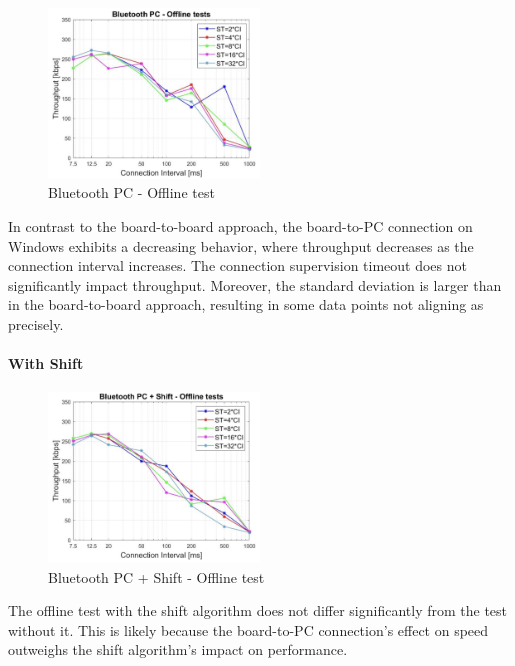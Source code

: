 \documentclass{Configuration_Files/PoliMi3i_thesis}
\begin{document}
\begin{figure}[H]
    \centering
    \includegraphics[width=0.5\textwidth]{Results Manuel/figure33}
    \caption{Bluetooth PC - Offline test}
    \label{manuel_results_33}
\end{figure}

In contrast to the board-to-board approach, the board-to-PC connection on Windows exhibits a decreasing behavior, where throughput decreases as the connection interval increases. The connection supervision timeout does not significantly impact throughput. Moreover, the standard deviation is larger than in the board-to-board approach, resulting in some data points not aligning as precisely.

\paragraph{With Shift}

\begin{figure}[H]
    \centering
    \includegraphics[width=0.5\textwidth]{Results Manuel/figure34}
    \caption{Bluetooth PC + Shift - Offline test}
    \label{manuel_results_34}
\end{figure}

The offline test with the shift algorithm does not differ significantly from the test without it. This is likely because the board-to-PC connection's effect on speed outweighs the shift algorithm's impact on performance.
\end{document}

